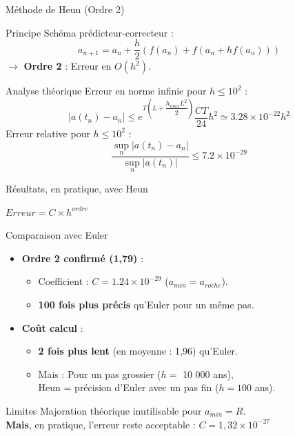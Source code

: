 \documentclass{beamer}
\begin{document}
	\begin{frame}{Méthode de Heun (Ordre 2)}
		\begin{block}{Principe}
			Schéma prédicteur-correcteur :
			\[
			a_{n+1} = a_n + \frac{h}{2} \left( f(a_n) + f(a_n + h f(a_n)) \right)
			\]
			$\to$ \textbf{Ordre 2} : Erreur en $O(h^2)$.
		\end{block}\pause
		
		\begin{block}{Analyse théorique}
			Erreur en norme infinie pour $ h \leq 10^{2}$ :
			\[
			|a(t_n) - a_n| \leq  e^{T\left(L+\dfrac{h_{max}L^2}2\right)}\dfrac{CT}{24}h^2 \simeq 3.28 \times 10^{-22} h^2 
			\]
			Erreur relative pour $ h \leq 10^{2}$ :
			\[
			\frac{\sup_n |a(t_n) - a_n|}{\sup_n |a(t_n)|} \leq 7.2 \times 10^{-29} 
			\]
		\end{block}
	\end{frame}
	
	\begin{frame}{Résultats, en pratique, avec Heun}
		
			\begin{center}
			$Erreur = C \times h^{ordre}$
		\end{center}
		
		\begin{block}{Comparaison avec Euler}
			\begin{itemize}
				\item \textbf{Ordre 2 confirmé (1,79)} :
				\begin{itemize}
					\item Coefficient : $C = 1.24 \times 10^{-29}$ ($a_{min} = a_{roche}$).
					\item \textbf{100 fois plus précis} qu'Euler pour un même pas.
				\end{itemize}\pause
				
				\vspace{.5cm}
				
				\item \textbf{Coût calcul} :
				\begin{itemize}
					\item \textbf{2 fois plus lent} (en moyenne : 1,96) qu'Euler.
					\item Mais : Pour un pas grossier ($h =$ 10 000 ans),\\
					     \hspace{1cm}Heun = précision d'Euler avec un pas fin ($h = 100$ ans).
				\end{itemize}
			\end{itemize}
		\end{block}\pause
		
		\begin{alertblock}{Limites}
			Majoration théorique inutilisable pour $a_{min} = R$. \\
			\textbf{Mais}, en pratique, l'erreur reste acceptable : $C =1,32\times10^{-27}$
		\end{alertblock}
	\end{frame}
	
\end{document}
